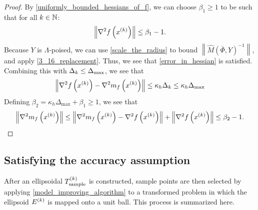 \documentclass{article}
\begin{document}
\begin{proof}

By \cref{uniformly_bounded_hessians_of_f}, we can choose $\beta_1 \ge 1$ to be such that for all $k \in\mathbb N$:
\begin{align*}
\left\|\nabla^2 f\left(x^{(k)}\right) \right\| \le \beta_1 - 1.
\end{align*}
Because $Y$ is $\Lambda$-poised, we can use \cref{scale_the_radius} to bound $\left\|\hat M\left(\bar \Phi, Y\right)^{-1}\right\|$, and apply \cref{3_16_replacement}.
Thus, we see that \cref{error_in_hessian} is satisfied.
Combining this with $\Delta_k \le {\Delta_{\textrm{max}}}$, we see that
\begin{align*}
\left\|\nabla^2 f\left(x^{(k)}\right) - \nabla^2 m_f\left(x^{(k)}\right) \right\| \le \kappa_{h} \Delta_k \le \kappa_{h} \Delta_{\text{max}}
\end{align*}
Defining $\beta_2 = \kappa_{h} \Delta_{\text{max}} + \beta_1 \ge 1$, we see that
\begin{align*}
\left\|\nabla^2 m_{f}\left(x^{(k)}\right)\right\| \le \left\|\nabla^2 m_{f}\left(x^{(k)}\right) - \nabla^2 f\left(x^{(k)}\right)  \right\| + \left\|\nabla^2 f\left(x^{(k)}\right) \right\|
\le \beta_2 - 1 .
\end{align*}
\end{proof}



\subsection{Satisfying the accuracy assumption}
\label{satisfying_accuracy}

After an ellipsoidal ${T_{\text{sample}}^{(k)}}$ is constructed,  sample points are then selected by applying  \cref{model_improving_algorithm} 
to a transformed problem in which the ellipsoid ${E^{(k)}}$ is mapped onto a unit ball.
This process is summarized here.
\end{document}
